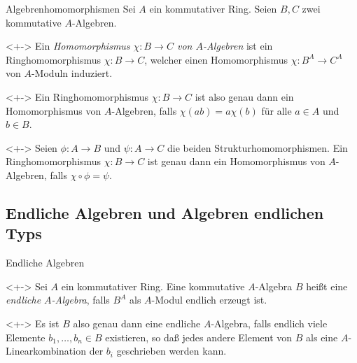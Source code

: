 \begin{frame}{Algebrenhomomorphismen}
	Sei \(A\) ein kommutativer Ring. Seien \(B, C\) zwei kommutative \(A\)-Algebren. 
	\begin{definition}<+->
		Ein \emph{Homomorphismus
		\(\chi\colon B \to C\) von \(A\)-Algebren} ist ein Ringhomomorphismus \(\chi\colon B \to C\), welcher
		einen Homomorphismus \(\chi\colon B^A \to C^A\) von \(A\)-Moduln induziert.
	\end{definition}
	\begin{visibleenv}<+->
		Ein Ringhomomorphismus \(\chi\colon B \to C\) ist also genau dann ein Homomorphismus von \(A\)-Algebren,
		falls \(\chi(a b) = a \chi(b)\) für alle \(a \in A\) und \(b \in B\).
	\end{visibleenv}
	\begin{remark}<+->
		Seien \(\phi\colon A \to B\) und \(\psi\colon A \to C\) die beiden Strukturhomomorphismen. Ein
		Ringhomomorphismus \(\chi\colon B \to C\) ist genau dann ein Homomorphismus von \(A\)-Algebren,
		falls \(\chi \circ \phi = \psi\).	
	\end{remark}
\end{frame}

\subsection{Endliche Algebren und Algebren endlichen Typs}

\begin{frame}{Endliche Algebren}
	\begin{definition}<+->
		Sei \(A\) ein kommutativer Ring. Eine kommutative \(A\)-Algebra \(B\) heißt eine \emph{endliche \(A\)-Algebra},
		falls \(B^A\) als \(A\)-Modul endlich erzeugt ist.
	\end{definition}
	\begin{visibleenv}<+->
		Es ist \(B\) also genau dann eine endliche \(A\)-Algebra, falls endlich viele Elemente \(b_1, \dotsc, b_n \in B\)
		existieren, so daß jedes andere Element von \(B\) als eine \(A\)-Linearkombination der \(b_i\) geschrieben werden
		kann.
	\end{visibleenv}
\end{frame}


